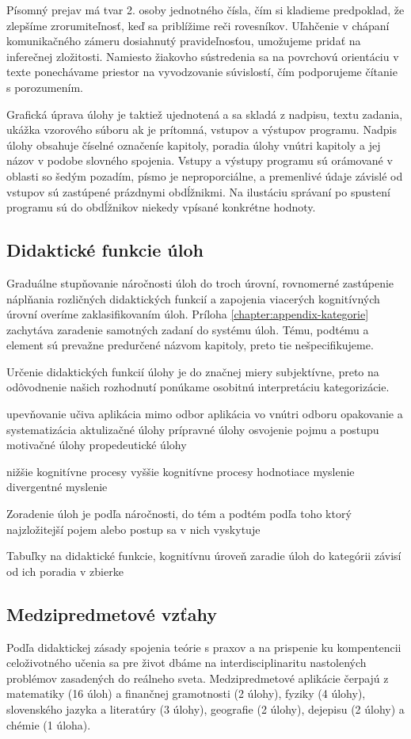 Písomný prejav má tvar 2. osoby jednotného čísla, čím si kladieme predpoklad, že zlepšíme zrorumiteľnosť, keď sa priblížime reči rovesníkov. Uľahčenie v chápaní komunikačného zámeru dosiahnutý pravideľnosťou, umožujeme pridať na inferečnej zložitosti. Namiesto žiakovho sústredenia sa na povrchovú orientáciu v texte ponechávame priestor na vyvodzovanie súvislostí, čím podporujeme čítanie s porozumením. 

Grafická úprava úlohy je taktiež ujednotená a sa skladá z nadpisu, textu zadania, ukážka vzorového súboru ak je prítomná, vstupov a výstupov programu. Nadpis úlohy obsahuje číselné označeníe kapitoly, poradia úlohy vnútri kapitoly a jej názov v podobe slovného spojenia.
Vstupy a výstupy programu sú orámované v oblasti so šedým pozadím, písmo je neproporciálne, a premenlivé údaje závislé od vstupov sú zastúpené prázdnymi obdĺžnikmi. Na ilustáciu správaní po spustení programu sú do obdĺžnikov niekedy vpísané konkrétne hodnoty.

\subsection{Didaktické funkcie úloh}
Graduálne stupňovanie náročnosti úloh do troch úrovní, rovnomerné zastúpenie náplňania rozličných didaktických funkcií a zapojenia viacerých kognitívných úrovní overíme zaklasifikovaním úloh. Príloha \ref{chapter:appendix-kategorie} zachytáva zaradenie samotných zadaní do systému úloh. Tému, podtému a element sú prevažne predurčené názvom kapitoly, preto tie nešpecifikujeme. 

Určenie didaktických funkcií úlohy je do značnej miery subjektívne, preto na odôvodnenie našich rozhodnutí ponúkame osobitnú interpretáciu kategorizácie.

upevňovanie učiva
aplikácia mimo odbor
aplikácia vo vnútri odboru
opakovanie a systematizácia
aktulizačné úlohy
prípravné úlohy
osvojenie pojmu a postupu
motivačné úlohy
propedeutické úlohy

nižšie kognitívne procesy
vyššie kognitívne procesy
hodnotiace myslenie
divergentné myslenie

Zoradenie úloh je podľa náročnosti, do tém a podtém podľa toho ktorý najzložitejší pojem alebo postup sa v nich vyskytuje

Tabuľky na didaktické funkcie, kognitívnu úroveň
zaradie úloh do kategórii závisí od ich poradia v zbierke

\subsection{Medzipredmetové vzťahy}
Podľa didaktickej zásady spojenia teórie s praxov a na prispenie ku kompentencii celoživotného učenia sa pre život dbáme na interdisciplinaritu nastolených problémov zasadených do reálneho sveta. Medzipredmetové aplikácie čerpajú z matematiky (16 úloh) a finančnej gramotnosti (2 úlohy), fyziky (4 úlohy), slovenského jazyka a literatúry (3 úlohy), geografie (2 úlohy), dejepisu (2 úlohy) a chémie (1 úloha). 


